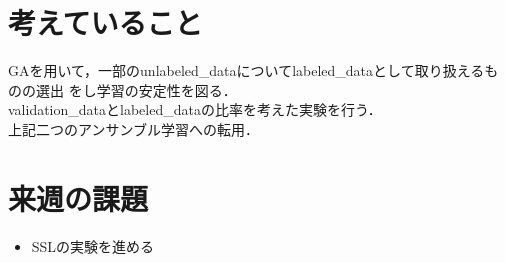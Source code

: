 \documentclass[twocolumn]{jarticle}     %
\begin{document}
\section{考えていること}
GAを用いて，一部のunlabeled\_dataについてlabeled\_dataとして取り扱えるものの選出
をし学習の安定性を図る．\\
validation\_dataとlabeled\_dataの比率を考えた実験を行う．\\
上記二つのアンサンブル学習への転用．

\section{来週の課題}
\begin{itemize}
	\item SSLの実験を進める
\end{itemize}
\end{document}
